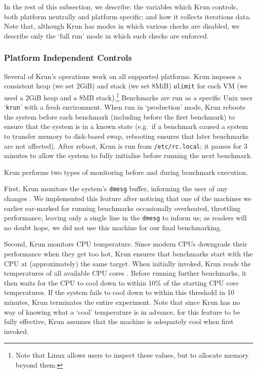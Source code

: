\documentclass[10pt,preprint]{sigplanconf}
\newcommand{\krun}{Krun\xspace}
\begin{document}
In the rest
of this subsection, we describe: the variables which \krun controls, both
platform neutrally and platform specific; and how it collects iterations data.
Note that, although \krun has modes in which various checks are disabled, we
describe only the `full run' mode in which such checks are enforced.


\subsubsection{Platform Independent Controls}

Several of \krun's operations work on all supported platforms. \krun imposes a
consistent heap (we set 2GiB) and stack (we set 8MiB) \texttt{ulimit} for each
VM (we used a 2GiB heap and a 8MB stack).\footnote{Note that Linux allows users
to inspect these values, but to allocate memory beyond them.} Benchmarks are run
as a specific Unix user `\texttt{krun}' with a fresh environment. When run in
`production' mode, \krun reboots the system before each benchmark (including
before the first benchmark) to ensure that the system is in a known state
(e.g.~if a benchmark caused a system to transfer memory to disk-based swap,
rebooting ensures that later benchmarks are not affected). After reboot, \krun
is run from \texttt{/etc/rc.local}; it pauses for 3 minutes to allow the system
to fully initialise before running the next benchmark.

\krun performs two types of monitoring before and during benchmark execution.

First, \krun monitors the system's \texttt{dmesg} buffer, informing the user of
any changes . We implemented this feature after noticing that one of the machines we
earlier ear-marked for running benchmarks occasionally overheated, throttling
performance, leaving only a single line in the \texttt{dmesg} to inform us; as
readers will no doubt hope, we did not use this machine for our final
benchmarking.

Second, \krun monitors CPU temperature. Since modern CPUs downgrade their
performance when they get too hot, \krun
ensures that benchmarks start with the CPU at (approximately) the same target.
When initially invoked, \krun reads the temperatures of all available CPU cores
. Before running
further benchmarks, it then waits for the CPU to cool down to within 10\%{} of
the starting CPU core temperatures. If the system fails to cool down to within
this threshold in 10 minutes, \krun terminates the entire experiment. Note that
since \krun has no way of knowing what a `cool' temperature is in advance, for
this feature to be fully effective, \krun assumes that the machine is adequately
cool when first invoked.
\end{document}

